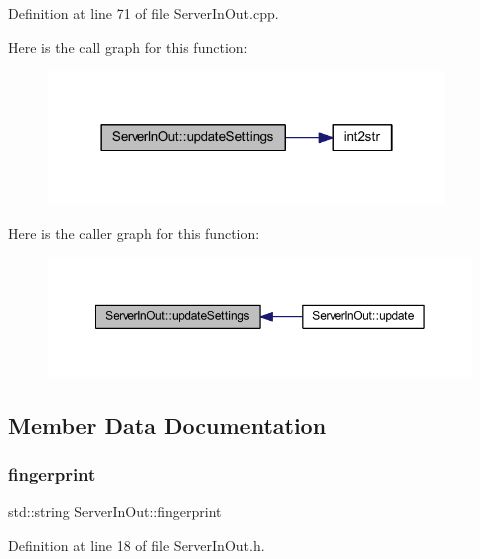 Definition at line 71 of file Server\+In\+Out.\+cpp.

Here is the call graph for this function\+:
\nopagebreak
\begin{figure}[H]
\begin{center}
\leavevmode
\includegraphics[width=298pt]{class_server_in_out_a687c760ff3ad5f33c6d157d9eaefc262_cgraph}
\end{center}
\end{figure}
Here is the caller graph for this function\+:
\nopagebreak
\begin{figure}[H]
\begin{center}
\leavevmode
\includegraphics[width=350pt]{class_server_in_out_a687c760ff3ad5f33c6d157d9eaefc262_icgraph}
\end{center}
\end{figure}


\subsection{Member Data Documentation}
\mbox{\label{class_server_in_out_a30de1f0615a253f6fff1876c310260d9}} 
\subsubsection{\texorpdfstring{fingerprint}{fingerprint}}
{\footnotesize\ttfamily std\+::string Server\+In\+Out\+::fingerprint\hspace{0.3cm}{\ttfamily [private]}}



Definition at line 18 of file Server\+In\+Out.\+h.

